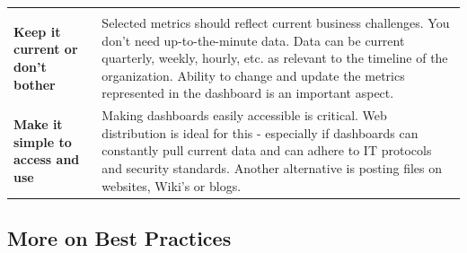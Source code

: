 \documentclass[]{book}
\begin{document}
\begin{longtable}[]{@{}ll@{}}
\begin{minipage}[t]{0.77\columnwidth}
\end{minipage}\tabularnewline
\begin{minipage}[t]{0.17\columnwidth}\raggedright
\textbf{Keep it current or don't bother}\strut
\end{minipage} & \begin{minipage}[t]{0.77\columnwidth}\raggedright
Selected metrics should reflect current business challenges. You don't need up-to-the-minute data. Data can be current quarterly, weekly, hourly, etc. as relevant to the timeline of the organization. Ability to change and update the metrics represented in the dashboard is an important aspect.\strut
\end{minipage}\tabularnewline
\begin{minipage}[t]{0.17\columnwidth}\raggedright
\textbf{Make it simple to access and use}\strut
\end{minipage} & \begin{minipage}[t]{0.77\columnwidth}\raggedright
Making dashboards easily accessible is critical. Web distribution is ideal for this - especially if dashboards can constantly pull current data and can adhere to IT protocols and security standards. Another alternative is posting files on websites, Wiki's or blogs.\strut
\end{minipage}\tabularnewline
\bottomrule
\end{longtable}

\hypertarget{more-on-best-practices}{%
\subsection{More on Best Practices}\label{more-on-best-practices}}
\end{document}
